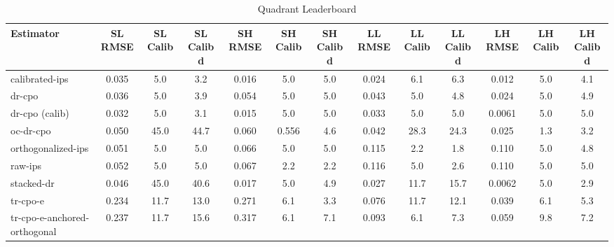 \begin{table}[htbp]
\centering
\caption{Quadrant Leaderboard}
\label{tab:A1}
\begin{tabular}{l|cccccccccccc}
\toprule
Estimator & SL RMSE & SL Calib & SL Calib d & SH RMSE & SH Calib & SH Calib d & LL RMSE & LL Calib & LL Calib d & LH RMSE & LH Calib & LH Calib d \\
\midrule
calibrated-ips & 0.035 & 5.0 & 3.2 & 0.016 & 5.0 & 5.0 & 0.024 & 6.1 & 6.3 & 0.012 & 5.0 & 4.1 \\
dr-cpo & 0.036 & 5.0 & 3.9 & 0.054 & 5.0 & 5.0 & 0.043 & 5.0 & 4.8 & 0.024 & 5.0 & 4.9 \\
dr-cpo (calib) & 0.032 & 5.0 & 3.1 & 0.015 & 5.0 & 5.0 & 0.033 & 5.0 & 5.0 & 0.0061 & 5.0 & 5.0 \\
oc-dr-cpo & 0.050 & 45.0 & 44.7 & 0.060 & 0.556 & 4.6 & 0.042 & 28.3 & 24.3 & 0.025 & 1.3 & 3.2 \\
orthogonalized-ips & 0.051 & 5.0 & 5.0 & 0.066 & 5.0 & 5.0 & 0.115 & 2.2 & 1.8 & 0.110 & 5.0 & 4.8 \\
raw-ips & 0.052 & 5.0 & 5.0 & 0.067 & 2.2 & 2.2 & 0.116 & 5.0 & 2.6 & 0.110 & 5.0 & 5.0 \\
stacked-dr & 0.046 & 45.0 & 40.6 & 0.017 & 5.0 & 4.9 & 0.027 & 11.7 & 15.7 & 0.0062 & 5.0 & 2.9 \\
tr-cpo-e & 0.234 & 11.7 & 13.0 & 0.271 & 6.1 & 3.3 & 0.076 & 11.7 & 12.1 & 0.039 & 6.1 & 5.3 \\
tr-cpo-e-anchored-orthogonal & 0.237 & 11.7 & 15.6 & 0.317 & 6.1 & 7.1 & 0.093 & 6.1 & 7.3 & 0.059 & 9.8 & 7.2 \\
\bottomrule
\end{tabular}
\end{table}